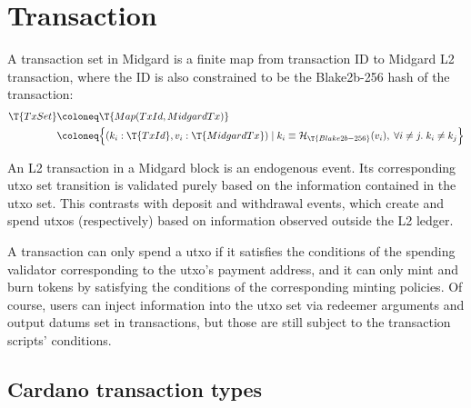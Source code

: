\documentclass[../midgard.tex]{subfiles}
\begin{document}
\section{Transaction}
\label{h:transaction}

A transaction set in Midgard is a finite map from transaction ID to Midgard L2 transaction, where the ID is also constrained to be the Blake2b-256 hash of the transaction:
\begin{align*}
    \T{TxSet} &\coloneq \T{Map(TxId, MidgardTx)} \\
      &\coloneq \Bigl\{
        (k_i: \T{TxId}, v_i: \T{MidgardTx}) \mid 
        k_i \equiv \mathcal{H}_\T{Blake2b-256}(v_i) ,\;
        \forall i \neq j.\; k_i \neq k_j
    \Bigr\}
\end{align*}

An L2 transaction in a Midgard block is an endogenous event.
Its corresponding utxo set transition is validated purely based on the information contained in the utxo set.
This contrasts with deposit and withdrawal events, which create and spend utxos (respectively) based on information observed outside the L2 ledger.

A transaction can only spend a utxo if it satisfies the conditions of the spending validator corresponding to the utxo's payment address, and it can only mint and burn tokens by satisfying the conditions of the corresponding minting policies.
Of course, users can inject information into the utxo set via redeemer arguments and output datums set in transactions, but those are still subject to the transaction scripts' conditions.

\subsection{Cardano transaction types}
\label{h:cardano-transaction-types}
\end{document}
